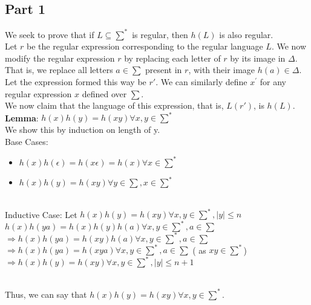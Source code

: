 \documentclass[12pt,a4paper]{article}
\begin{document}
\subsection{Part 1}
We seek to prove that if $L \subseteq \sum^*$ is regular, then $h(L)$ is also regular.
\\Let $r$ be the regular expression corresponding to the regular language $L$.
We now modify the regular expression $r$ by replacing each letter of $r$ by its image in $\Delta$.
That is, we replace all letters $a \in \sum$ present in $r$, with their image $h(a) \in \Delta$. Let the expression formed this way be $r'$. We can similarly define $x^'$ for any regular expression $x$ defined over $\sum$.
\\We now claim that the language of this expression, that is, $L(r')$, is $h(L)$.
\\\textbf{Lemma}: $h(x)h(y) = h(xy) \forall x,y \in \sum^*$
\\We show this by induction on length of y.
\\Base Cases: 
\begin{itemize}
\item $h(x)h(\epsilon) = h(x\epsilon) = h(x) \forall x \in \sum^*$
\item $h(x)h(y) = h(xy) \forall y \in \sum, x \in \sum^*$
\end{itemize}
\\Inductive Case: Let $h(x)h(y) = h(xy) \forall x,y \in \sum^*, \vert y \vert \leq n$
\\$h(x)h(ya) = h(x)h(y)h(a) \forall x,y \in \sum^*, a \in \sum $
\\ $\Rightarrow h(x)h(ya) = h(xy)h(a) \forall x,y \in \sum^*, a \in \sum $
\\ $\Rightarrow h(x)h(ya) = h(xya) \forall x,y \in \sum^*, a \in \sum $ ( as $xy \in \sum^*$)
\\ $\Rightarrow h(x)h(y) = h(xy) \forall x,y \in \sum^*, \vert y \vert \leq n + 1 $

\\Thus, we can say that $h(x)h(y) = h(xy) \forall x,y \in \sum^*$.
\end{document}
